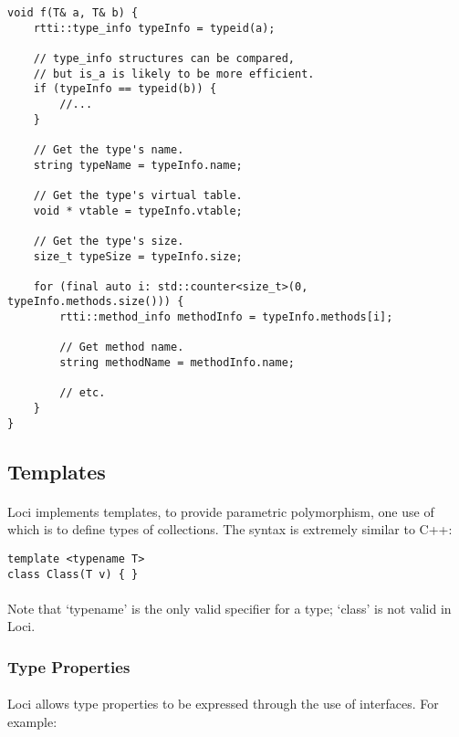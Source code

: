\documentclass[12pt,twoside,notitlepage]{report}
\begin{document}
\begin{lstlisting}
void f(T& a, T& b) {
	rtti::type_info typeInfo = typeid(a);
	
	// type_info structures can be compared,
	// but is_a is likely to be more efficient.
	if (typeInfo == typeid(b)) {
		//...
	}
	
	// Get the type's name.
	string typeName = typeInfo.name;
	
	// Get the type's virtual table.
	void * vtable = typeInfo.vtable;
	
	// Get the type's size.
	size_t typeSize = typeInfo.size;
	
	for (final auto i: std::counter<size_t>(0, typeInfo.methods.size())) {
		rtti::method_info methodInfo = typeInfo.methods[i];
		
		// Get method name.
		string methodName = methodInfo.name;
		
		// etc.
	}
}
\end{lstlisting}

\clearpage

\subsection{Templates}

\paragraph{}
Loci implements templates, to provide parametric polymorphism, one use of which is to define types of collections. The syntax is extremely similar to C++:

\begin{lstlisting}
template <typename T>
class Class(T v) { }
\end{lstlisting}

\paragraph{}
Note that `typename' is the only valid specifier for a type; `class' is not valid in Loci.

\subsubsection{Type Properties}

\paragraph{}
Loci allows type properties to be expressed through the use of interfaces. For example:
\end{document}
